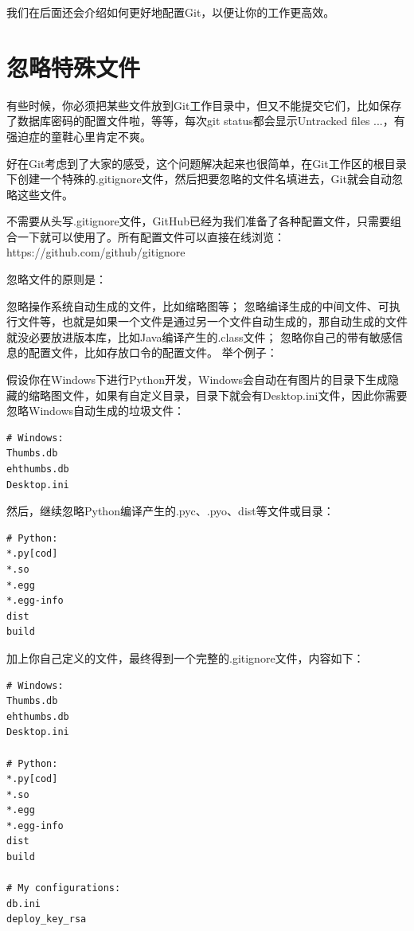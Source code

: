 我们在后面还会介绍如何更好地配置Git，以便让你的工作更高效。


\section{忽略特殊文件}
有些时候，你必须把某些文件放到Git工作目录中，但又不能提交它们，比如保存了数据库密码的配置文件啦，等等，每次git status都会显示Untracked files ...，有强迫症的童鞋心里肯定不爽。

好在Git考虑到了大家的感受，这个问题解决起来也很简单，在Git工作区的根目录下创建一个特殊的.gitignore文件，然后把要忽略的文件名填进去，Git就会自动忽略这些文件。

不需要从头写.gitignore文件，GitHub已经为我们准备了各种配置文件，只需要组合一下就可以使用了。所有配置文件可以直接在线浏览：https://github.com/github/gitignore

忽略文件的原则是：

忽略操作系统自动生成的文件，比如缩略图等；
忽略编译生成的中间文件、可执行文件等，也就是如果一个文件是通过另一个文件自动生成的，那自动生成的文件就没必要放进版本库，比如Java编译产生的.class文件；
忽略你自己的带有敏感信息的配置文件，比如存放口令的配置文件。
举个例子：

假设你在Windows下进行Python开发，Windows会自动在有图片的目录下生成隐藏的缩略图文件，如果有自定义目录，目录下就会有Desktop.ini文件，因此你需要忽略Windows自动生成的垃圾文件：

\begin{verbatim}
# Windows:
Thumbs.db
ehthumbs.db
Desktop.ini
\end{verbatim}

然后，继续忽略Python编译产生的.pyc、.pyo、dist等文件或目录：

\begin{verbatim}
# Python:
*.py[cod]
*.so
*.egg
*.egg-info
dist
build
\end{verbatim}

加上你自己定义的文件，最终得到一个完整的.gitignore文件，内容如下：

\begin{verbatim}
# Windows:
Thumbs.db
ehthumbs.db
Desktop.ini

# Python:
*.py[cod]
*.so
*.egg
*.egg-info
dist
build

# My configurations:
db.ini
deploy_key_rsa
\end{verbatim}

